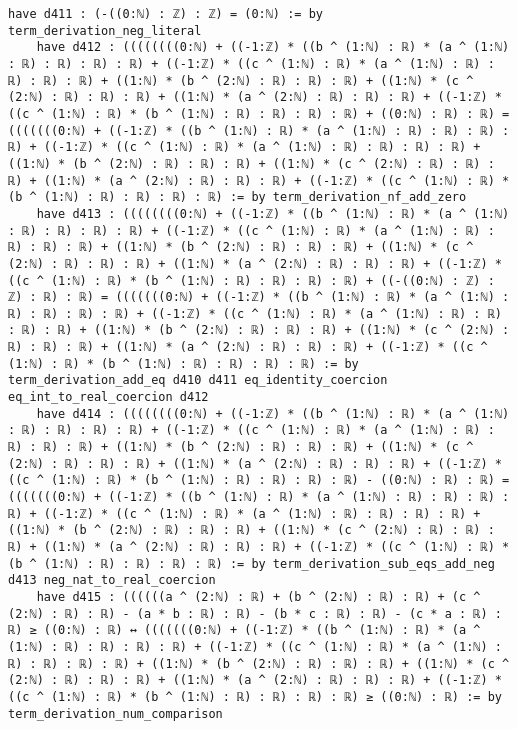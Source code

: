 \documentclass{article}
\begin{document}
\begin{tcolorbox}[colback=white!10, width=\linewidth]
\begin{lstlisting}[language=Lean4]
    have d411 : (-((0:ℕ) : ℤ) : ℤ) = (0:ℕ) := by term_derivation_neg_literal
    have d412 : ((((((((0:ℕ) + ((-1:ℤ) * ((b ^ (1:ℕ) : ℝ) * (a ^ (1:ℕ) : ℝ) : ℝ) : ℝ) : ℝ) + ((-1:ℤ) * ((c ^ (1:ℕ) : ℝ) * (a ^ (1:ℕ) : ℝ) : ℝ) : ℝ) : ℝ) + ((1:ℕ) * (b ^ (2:ℕ) : ℝ) : ℝ) : ℝ) + ((1:ℕ) * (c ^ (2:ℕ) : ℝ) : ℝ) : ℝ) + ((1:ℕ) * (a ^ (2:ℕ) : ℝ) : ℝ) : ℝ) + ((-1:ℤ) * ((c ^ (1:ℕ) : ℝ) * (b ^ (1:ℕ) : ℝ) : ℝ) : ℝ) : ℝ) + ((0:ℕ) : ℝ) : ℝ) = (((((((0:ℕ) + ((-1:ℤ) * ((b ^ (1:ℕ) : ℝ) * (a ^ (1:ℕ) : ℝ) : ℝ) : ℝ) : ℝ) + ((-1:ℤ) * ((c ^ (1:ℕ) : ℝ) * (a ^ (1:ℕ) : ℝ) : ℝ) : ℝ) : ℝ) + ((1:ℕ) * (b ^ (2:ℕ) : ℝ) : ℝ) : ℝ) + ((1:ℕ) * (c ^ (2:ℕ) : ℝ) : ℝ) : ℝ) + ((1:ℕ) * (a ^ (2:ℕ) : ℝ) : ℝ) : ℝ) + ((-1:ℤ) * ((c ^ (1:ℕ) : ℝ) * (b ^ (1:ℕ) : ℝ) : ℝ) : ℝ) : ℝ) := by term_derivation_nf_add_zero
    have d413 : ((((((((0:ℕ) + ((-1:ℤ) * ((b ^ (1:ℕ) : ℝ) * (a ^ (1:ℕ) : ℝ) : ℝ) : ℝ) : ℝ) + ((-1:ℤ) * ((c ^ (1:ℕ) : ℝ) * (a ^ (1:ℕ) : ℝ) : ℝ) : ℝ) : ℝ) + ((1:ℕ) * (b ^ (2:ℕ) : ℝ) : ℝ) : ℝ) + ((1:ℕ) * (c ^ (2:ℕ) : ℝ) : ℝ) : ℝ) + ((1:ℕ) * (a ^ (2:ℕ) : ℝ) : ℝ) : ℝ) + ((-1:ℤ) * ((c ^ (1:ℕ) : ℝ) * (b ^ (1:ℕ) : ℝ) : ℝ) : ℝ) : ℝ) + ((-((0:ℕ) : ℤ) : ℤ) : ℝ) : ℝ) = (((((((0:ℕ) + ((-1:ℤ) * ((b ^ (1:ℕ) : ℝ) * (a ^ (1:ℕ) : ℝ) : ℝ) : ℝ) : ℝ) + ((-1:ℤ) * ((c ^ (1:ℕ) : ℝ) * (a ^ (1:ℕ) : ℝ) : ℝ) : ℝ) : ℝ) + ((1:ℕ) * (b ^ (2:ℕ) : ℝ) : ℝ) : ℝ) + ((1:ℕ) * (c ^ (2:ℕ) : ℝ) : ℝ) : ℝ) + ((1:ℕ) * (a ^ (2:ℕ) : ℝ) : ℝ) : ℝ) + ((-1:ℤ) * ((c ^ (1:ℕ) : ℝ) * (b ^ (1:ℕ) : ℝ) : ℝ) : ℝ) : ℝ) := by term_derivation_add_eq d410 d411 eq_identity_coercion eq_int_to_real_coercion d412
    have d414 : ((((((((0:ℕ) + ((-1:ℤ) * ((b ^ (1:ℕ) : ℝ) * (a ^ (1:ℕ) : ℝ) : ℝ) : ℝ) : ℝ) + ((-1:ℤ) * ((c ^ (1:ℕ) : ℝ) * (a ^ (1:ℕ) : ℝ) : ℝ) : ℝ) : ℝ) + ((1:ℕ) * (b ^ (2:ℕ) : ℝ) : ℝ) : ℝ) + ((1:ℕ) * (c ^ (2:ℕ) : ℝ) : ℝ) : ℝ) + ((1:ℕ) * (a ^ (2:ℕ) : ℝ) : ℝ) : ℝ) + ((-1:ℤ) * ((c ^ (1:ℕ) : ℝ) * (b ^ (1:ℕ) : ℝ) : ℝ) : ℝ) : ℝ) - ((0:ℕ) : ℝ) : ℝ) = (((((((0:ℕ) + ((-1:ℤ) * ((b ^ (1:ℕ) : ℝ) * (a ^ (1:ℕ) : ℝ) : ℝ) : ℝ) : ℝ) + ((-1:ℤ) * ((c ^ (1:ℕ) : ℝ) * (a ^ (1:ℕ) : ℝ) : ℝ) : ℝ) : ℝ) + ((1:ℕ) * (b ^ (2:ℕ) : ℝ) : ℝ) : ℝ) + ((1:ℕ) * (c ^ (2:ℕ) : ℝ) : ℝ) : ℝ) + ((1:ℕ) * (a ^ (2:ℕ) : ℝ) : ℝ) : ℝ) + ((-1:ℤ) * ((c ^ (1:ℕ) : ℝ) * (b ^ (1:ℕ) : ℝ) : ℝ) : ℝ) : ℝ) := by term_derivation_sub_eqs_add_neg d413 neg_nat_to_real_coercion
    have d415 : ((((((a ^ (2:ℕ) : ℝ) + (b ^ (2:ℕ) : ℝ) : ℝ) + (c ^ (2:ℕ) : ℝ) : ℝ) - (a * b : ℝ) : ℝ) - (b * c : ℝ) : ℝ) - (c * a : ℝ) : ℝ) ≥ ((0:ℕ) : ℝ) ↔ (((((((0:ℕ) + ((-1:ℤ) * ((b ^ (1:ℕ) : ℝ) * (a ^ (1:ℕ) : ℝ) : ℝ) : ℝ) : ℝ) + ((-1:ℤ) * ((c ^ (1:ℕ) : ℝ) * (a ^ (1:ℕ) : ℝ) : ℝ) : ℝ) : ℝ) + ((1:ℕ) * (b ^ (2:ℕ) : ℝ) : ℝ) : ℝ) + ((1:ℕ) * (c ^ (2:ℕ) : ℝ) : ℝ) : ℝ) + ((1:ℕ) * (a ^ (2:ℕ) : ℝ) : ℝ) : ℝ) + ((-1:ℤ) * ((c ^ (1:ℕ) : ℝ) * (b ^ (1:ℕ) : ℝ) : ℝ) : ℝ) : ℝ) ≥ ((0:ℕ) : ℝ) := by term_derivation_num_comparison

\end{lstlisting}
\end{tcolorbox}
\end{document}
